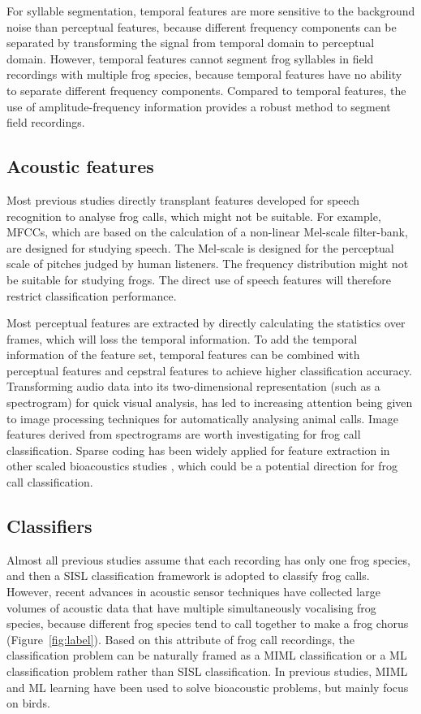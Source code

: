 For syllable segmentation, temporal features are more sensitive to  the background noise than perceptual features, because different frequency components can be separated by transforming the signal from temporal domain to perceptual domain. However, temporal features cannot segment  frog syllables in field recordings with multiple frog species, because temporal features have no ability to separate different frequency components. Compared to temporal features, the use of amplitude-frequency information provides a robust method to segment field recordings. 




\subsection{Acoustic features}
Most previous studies directly transplant features developed for speech recognition to analyse frog calls, which might not be suitable. For example, MFCCs, which are based on the calculation of a non-linear Mel-scale filter-bank, are designed for studying speech. The Mel-scale is designed for the perceptual scale of pitches judged by human listeners. The frequency distribution might not be suitable for studying frogs. The direct use of speech features will therefore restrict classification performance. 

Most perceptual features are extracted by directly calculating the statistics over frames, which will loss the temporal information. To add the temporal information of the feature set, temporal features can be combined with perceptual features and cepstral features to achieve higher classification accuracy. Transforming audio data into its two-dimensional representation (such as a spectrogram) for quick visual analysis, has led to increasing attention being given to image processing techniques for automatically analysing animal calls. Image features derived from spectrograms are worth investigating for frog call classification. Sparse coding has been widely applied for feature extraction in other scaled bioacoustics studies \citep{glotin2013sparse, razik2015sparse}, which could be a potential direction for frog call classification.

\subsection{Classifiers}
Almost all previous studies assume that each recording has only one frog species, and then a SISL classification framework is adopted to classify frog calls. However, recent advances in acoustic sensor techniques have collected large volumes of acoustic data that have multiple simultaneously vocalising frog species, because different frog species tend to call together to make a frog chorus (Figure~\ref{fig:label}). Based on this attribute of frog call recordings, the classification problem can be naturally framed as a MIML classification or a ML classification problem rather than SISL classification. In previous studies, MIML and ML learning have been used to solve bioacoustic problems, but mainly focus on birds. 

